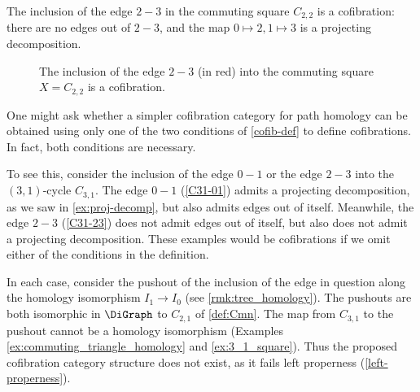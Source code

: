 \begin{example}\label{ex:cofib}
The inclusion of the edge $2-3$ in the commuting square $C_{2,2}$ is a cofibration: there are no edges out of $2-3$, and the map $0 \mapsto 2, 1 \mapsto 3$ is a projecting decomposition.

    \begin{figure}[H]
        \centering
        \label{C22-23}
        \caption{The inclusion of the edge $2-3$ (in red) into the commuting square $X = C_{2,2}$ is a cofibration.}
    \end{figure} 


\end{example}

\begin{remark}\label{rmk:cofib-both-conditions}
One might ask whether a simpler cofibration category for path homology can be obtained using only one of the two conditions of \cref{cofib-def} to define cofibrations. In fact, both conditions are necessary.  

To see this, consider the inclusion of the edge $0-1$ or the edge $2-3$ into the $(3,1)$-cycle $C_{3,1}$. The edge $0-1$ (\cref{C31-01}) admits a projecting decomposition, as we saw in \cref{ex:proj-decomp}, but also admits edges out of itself. Meanwhile, the edge $2-3$ (\cref{C31-23}) does not admit edges out of itself, but also does not admit a projecting decomposition. These examples would be cofibrations if we omit either of the conditions in the definition. 

In each case, consider the pushout of the inclusion of the edge in question along the homology isomorphism $I_1 \to I_0$ (see \cref{rmk:tree_homology}).
The pushouts are both isomorphic in $\DiGraph$ to $C_{2,1}$ of \cref{def:Cmn}.
The map from $C_{3,1}$ to the pushout cannot be a homology isomorphism (Examples \ref{ex:commuting_triangle_homology} and \ref{ex:3_1_square}).
Thus the proposed cofibration category structure does not exist, as it fails left properness (\cref{left-properness}).
\end{remark}

